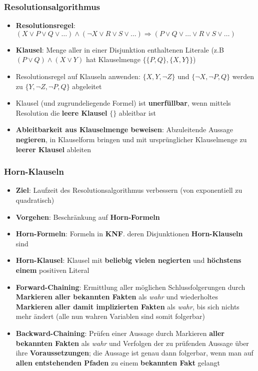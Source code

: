 \subsubsection{Resolutionsalgorithmus}%
\label{wrep:ssub:auss_resolutionsalgorithmus}

\begin{itemize}
	\item \textbf{Resolutionsregel}: $(X \lor P \lor Q \lor \dots) \land (\neg X \lor R \lor S \lor \dots) \Rightarrow (P \lor Q \lor \dots \lor R \lor S \lor \dots)$
	\item \textbf{Klausel}: Menge aller in einer Disjunktion enthaltenen Literale (z.B $(P \lor Q) \land (X \lor Y)$ hat Klauselmenge $\{\{P, Q\}, \{X, Y\}\}$)
	\item Resolutionsregel auf Klauseln anwenden: $\{X, Y, \neg Z\}$ und $\{\neg X, \neg P, Q\}$ werden zu $\{Y, \neg Z, \neg P, Q\}$ abgeleitet
	\item Klausel (und zugrundeliegende Formel) ist \textbf{unerfüllbar}, wenn mittels Resolution die \textbf{leere Klausel} $\{\}$ ableitbar ist
	\item \textbf{Ableitbarkeit aus Klauselmenge beweisen}: Abzuleitende Aussage \textbf{negieren}, in Klauselform bringen und mit ursprünglicher Klauselmenge zu \textbf{leerer Klausel} ableiten
\end{itemize}

\subsubsection{Horn-Klauseln}%
\label{wrep:ssub:horn_klauseln}

\begin{itemize}
	\item \textbf{Ziel}: Laufzeit des Resolutionsalgorithmus verbessern (von exponentiell zu quadratisch)
	\item \textbf{Vorgehen}: Beschränkung auf \textbf{Horn-Formeln}
	\item \textbf{Horn-Formeln}: Formeln in \textbf{KNF}. deren Disjunktionen \textbf{Horn-Klauseln} sind
	\item \textbf{Horn-Klausel}: Klausel mit \textbf{beliebig vielen negierten} und \textbf{höchstens einem} positiven Literal
	\item \textbf{Forward-Chaining}: Ermittlung aller möglichen Schlussfolgerungen durch \textbf{Markieren aller bekannten Fakten} als \textit{wahr} und wiederholtes \textbf{Markieren aller damit implizierten Fakten} als \textit{wahr}, bis sich nichts mehr ändert (alle nun wahren Variablen sind somit folgerbar)
	\item \textbf{Backward-Chaining}: Prüfen einer Aussage durch Markieren \textbf{aller bekannten Fakten} als \textit{wahr} und Verfolgen der zu prüfenden Aussage über ihre \textbf{Voraussetzungen}; die Aussage ist genau dann folgerbar, wenn man auf \textbf{allen entstehenden Pfaden} zu einem \textbf{bekannten Fakt} gelangt
\end{itemize}

